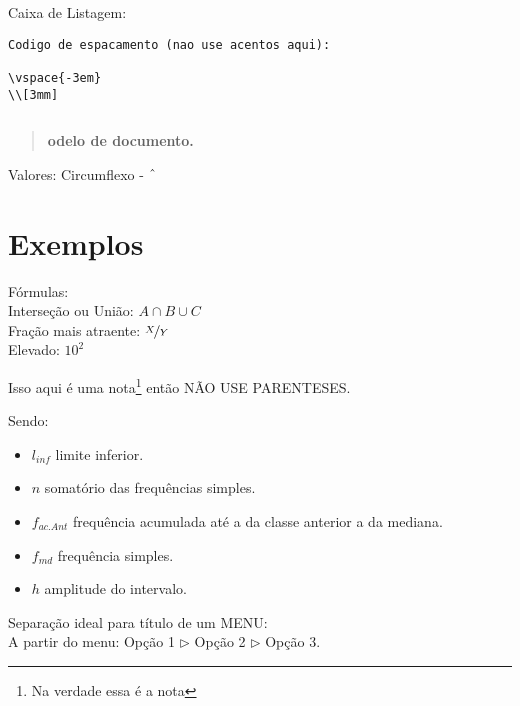 \documentclass[a4paper,11pt]{article}
\begin{document}
Caixa de Listagem:
\begin{lstlisting}[]
Codigo de espacamento (nao use acentos aqui):

\vspace{-3em}
\\[3mm]
\end{lstlisting}

\begin{lstlisting}[]
\end{lstlisting}

\maketitle %
\thispagestyle{fancy} %

\begin{abstract}
	\textbf{odelo de documento. \lipsum[4-1]}
\end{abstract}

Valores:
Circumflexo - $\string^$

\section{Exemplos}

Fórmulas: \\
Interseção ou União: $A \cap B \cup C$ \\
Fração mais atraente: $\nicefrac{X}{Y}$ \\
Elevado: $10^2$

Isso aqui é uma nota\footnote{Na verdade essa é a nota} então NÃO USE PARENTESES.

Sendo: \vspace{-1em}
\begin{itemize}[nolistsep]
	\item $l_{inf}$ limite inferior.
	\item $n$ somatório das frequências simples.
	\item $f_{ac.Ant}$ frequência acumulada até a da classe anterior a da mediana.
	\item $f_{md}$ frequência simples.
	\item $h$ amplitude do intervalo.
\end{itemize}

Separação ideal para título de um MENU: \\
A partir do menu: Opção 1 $\triangleright$ Opção 2 $\triangleright$ Opção 3.
\end{document}
